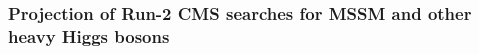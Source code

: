 \subsubsection{Projection of Run-2 CMS searches for MSSM and other heavy Higgs bosons}

\newcommand{\emu}{\Pe\Pgm}
\newcommand{\mumu}{\Pgm\Pgm}
\newcommand{\mutau}{\Pgm\Pgt_{\rm{h}}}
\newcommand{\etau}{\Pe\Pgt_{\rm{h}}}
\newcommand{\tauhad}{\Pgt_{\rm{h}}}
\newcommand{\tautau}{\Pgt_{\rm{h}}\Pgt_{\rm{h}}}

\newcommand{\ZJets}{\ensuremath{\PZ}/\ensuremath{\Pgg^{*}}{+}\text{jets}\xspace}
\newcommand{\WJets}{\ensuremath{\PW}{+}\text{jets}\xspace}
\newcommand{\ttbarJets}{\ensuremath{\Pqt\Paqt}{+}\text{jets}\xspace}
\newcommand{\ztt}{\ensuremath{\PZ\to\Pgt\Pgt}\xspace}
\newcommand{\htt}{\ensuremath{\PH\to\Pgt\Pgt}\xspace}

\newcommand{\pzetavis}{\ensuremath{p_{\zeta}^{\text{vis}}}\xspace}
\newcommand{\pzetamiss}{\ensuremath{p_{\zeta}^{\text{miss}}}\xspace}

\newcommand{\mhmodp}{\ensuremath{m_{\Ph}^{\text{mod+}}}\xspace}
\newcommand{\mA}{\ensuremath{m_{\text{A}}}\xspace}
\providecommand{\e}[1]{\ensuremath{\times 10^{#1}}}


\newcommand{\fbinv}{\text{fb}\ensuremath{^{-1}}}






